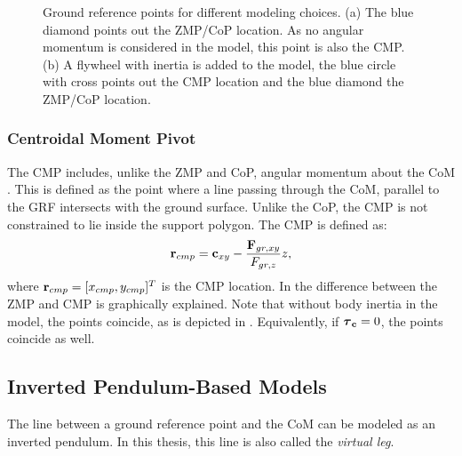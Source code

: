 \begin{figure}
\begin{subfigure}{0.49\textwidth}
\caption{}
\label{fig:3dlipfootinertia}
\end{subfigure}
\caption{Ground reference points for different modeling choices. (a) The blue diamond points out the \ac{ZMP}/\ac{CoP} location. As no angular momentum is considered in the model,  this point is also the \ac{CMP}. (b) A flywheel with inertia is added to the model, the blue circle with cross points out the \ac{CMP} location and the blue diamond the \ac{ZMP}/\ac{CoP} location.}
\label{fig:zmpvscmp}
\end{figure}

\subsubsection{Centroidal Moment Pivot} 
The \acf{CMP} includes, unlike the \ac{ZMP} and \ac{CoP}, angular momentum about the \ac{CoM}  \cite{popovic2005ground}. This is defined as the point where a line passing through the \ac{CoM}, parallel to the \ac{GRF} intersects with the ground surface. Unlike the \ac{CoP}, the \ac{CMP} is not constrained to lie inside the support polygon. The \ac{CMP} is defined as:
\begin{equation}
    \mathbf{r}_{cmp}=\mathbf{c}_{xy}-\frac{\mathbf{F}_{gr,xy}}{F_{gr,z}}z,
    \label{eq:cmp}
\end{equation}
where $\mathbf{r}_{cmp} =[x_{cmp}, y_{cmp}]^T$ is the \ac{CMP} location. In  the difference between the \ac{ZMP} and \ac{CMP} is graphically explained. Note that without body inertia in the model, the points coincide, as is depicted in . Equivalently, if $\boldsymbol{\tau}_{\mathbf{c}}=0$, the points coincide as well.

\subsection{Inverted Pendulum-Based Models}
The line between a ground reference point and the \ac{CoM} can be modeled as an inverted pendulum. In this thesis, this line is also called the \textit{virtual leg}.

